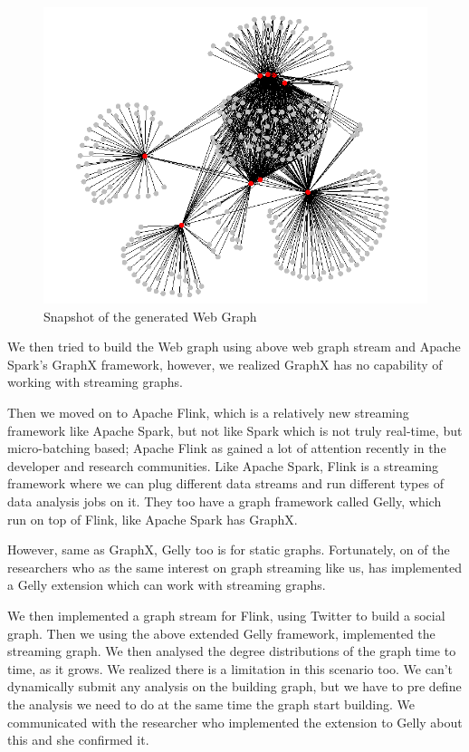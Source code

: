 \documentclass[12pt]{article}
\begin{document}
\begin{figure}[H]
\centering
\includegraphics[scale=0.3]{web-graph.png}
\caption{Snapshot of the generated Web Graph}
\label{fig:web-graph}
\end{figure}

We then tried to build the Web graph using above web graph stream and Apache Spark's GraphX framework, however, we realized GraphX has no capability of working with streaming graphs. 

Then we moved on to Apache Flink, which is a relatively new streaming framework like Apache Spark, but not like Spark which is not truly real-time, but micro-batching based; Apache Flink as gained a lot of attention recently in the developer and research communities. Like Apache Spark, Flink is a streaming framework where we can plug different data streams and run different types of data analysis jobs on it. They too have a graph framework called Gelly, which run on top of Flink, like Apache Spark has GraphX.

However, same as GraphX, Gelly too is for static graphs. Fortunately, on of the researchers who as the same interest on graph streaming like us, has implemented a Gelly extension which can work with streaming graphs.

We then implemented a graph stream for Flink, using Twitter to build a social graph. Then we using the above extended Gelly framework, implemented the streaming graph. We then analysed the degree distributions of the graph time to time, as it grows. We realized there is a limitation in this scenario too. We can't dynamically submit any analysis on the building graph, but we have to pre define the analysis we need to do at the same time the graph start building. We communicated with the researcher who implemented the extension to Gelly about this and she confirmed it. 
\end{document}
